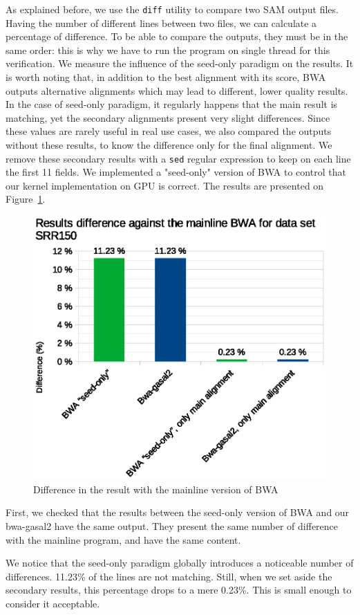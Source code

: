 
As explained before, we use the \verb|diff| utility to compare two SAM output files. Having the number of different lines between two files, we can calculate a percentage of difference. To be able to compare the outputs, they must be in the same order: this is why we have to run the program on single thread for this verification. We measure the influence of the seed-only paradigm on the results. It is worth noting that, in addition to the best alignment with its score, BWA outputs alternative alignments which may lead to different, lower quality results. In the case of seed-only paradigm, it regularly happens that the main result is matching, yet the secondary alignments present very slight differences. Since these values are rarely useful in real use cases, we also compared the outputs without these results, to know the difference only for the final alignment. We remove these secondary results with a \verb|sed| regular expression to keep on each line the first 11 fields. We implemented a "seed-only" version of BWA to control that our kernel implementation on GPU is correct. The results are presented on Figure~\ref{fig:result-diff-srr150}.

\begin{figure}[h!]
	\centering
	\includegraphics[width=1\linewidth]{srr150/result-diff-srr150}
	\caption{Difference in the result with the mainline version of BWA}
	\label{fig:result-diff-srr150}
\end{figure}

First, we checked that the results between the seed-only version of BWA and our bwa-gasal2 have the same output. They present the same number of difference with the mainline program, and have the same content.

We notice that the seed-only paradigm globally introduces a noticeable number of differences. 11.23\% of the lines are not matching. Still, when we set aside the secondary results, this percentage drops to a mere 0.23\%. This is small enough to consider it acceptable.


